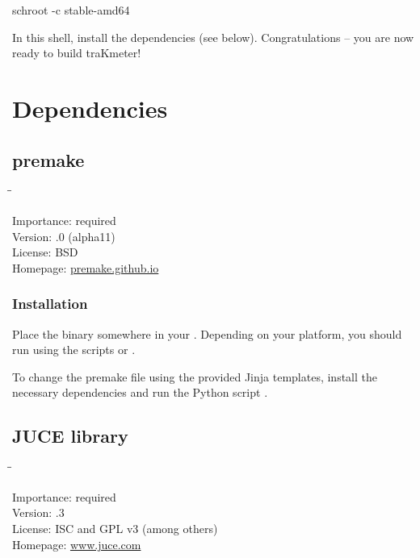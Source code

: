 \begin{Verbatim64}
  schroot -c stable-amd64
\end{Verbatim64}

In this  shell, install the dependencies (see below).
Congratulations -- you are now ready to build traKmeter!

\section{Dependencies}

\subsection{premake}
\label{sec:dependencies_premake}

\begin{tabbing}
  \hspace*{6em}\=\=\kill

  Importance:  \> required \\
  Version:     .0 (alpha11) \\
  License:     \> BSD \\
  Homepage:    \> \href{https://premake.github.io/}{premake.github.io}
\end{tabbing}

\subsubsection{Installation}

Place the binary somewhere in your .  Depending on your
platform, you should run  using the scripts
 or .

To change the premake file using the provided Jinja templates, install
the necessary dependencies and run the Python script
.

\newpage %

\subsection{JUCE library}

\begin{tabbing}
  \hspace*{6em}\=\=\kill

  Importance:  \> required \\
  Version:     .3 \\
  License:     \> ISC and GPL v3 (among others) \\
  Homepage:    \> \href{http://www.juce.com/}{www.juce.com}
\end{tabbing}

